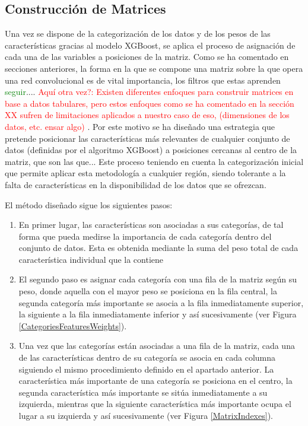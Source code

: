 \documentclass{uathesis-es}
\begin{document}
\subsection{Construcción de Matrices}

Una vez se dispone de la categorización de los datos y de los pesos de las características gracias al modelo XGBoost, se aplica el proceso de asignación de cada una de las variables a posiciones de la matriz. Como se ha comentado en secciones anteriores, la forma en la que se compone una matriz sobre la que opera una red convolucional es de vital importancia, los filtros que estas aprenden \textcolor{green}{seguir}.... \textcolor{red}{Aquí otra vez?: Existen diferentes enfoques para construir matrices en base a datos tabulares, pero estos enfoques como se ha comentado en la sección XX sufren de limitaciones aplicados a nuestro caso de eso, (dimensiones de los datos, etc. ensar algo)} . Por este motivo se ha diseñado una estrategia que pretende posicionar las características más relevantes de cualquier conjunto de datos (definidas por el algoritmo XGBoost) a posiciones cercanas al centro de la matriz, que son las que... Este proceso teniendo en cuenta la categorización inicial que permite aplicar esta metodología a cualquier región, siendo tolerante a la falta de características en la disponibilidad de los datos que se ofrezcan.

El método diseñado sigue los siguientes pasos:

\begin{enumerate}
    \item En primer lugar, las características son asociadas a sus categorías, de tal forma que pueda medirse la importancia de cada categoría dentro del conjunto de datos. Esta es obtenida mediante la suma del peso total de cada característica individual que la contiene
    \item El segundo paso es asignar cada categoría con una fila de la matriz según su peso, donde aquella con el mayor peso se posiciona en la fila central, la segunda categoría más importante se asocia a la fila inmediatamente superior, la siguiente a la fila inmediatamente inferior y así sucesivamente (ver Figura \ref{CategoriesFeaturesWeights}).
    \item Una vez que las categorías están asociadas a una fila de la matriz, cada una de las características dentro de su categoría se asocia en cada columna siguiendo el mismo procedimiento definido en el apartado anterior. La característica más importante de una categoría se posiciona en el centro, la segunda característica más importante se sitúa inmediatamente a su izquierda, mientras que la siguiente característica más importante ocupa el lugar a su izquierda y así sucesivamente (ver Figura \ref{MatrixIndexes}).
\end{enumerate}
\end{document}
